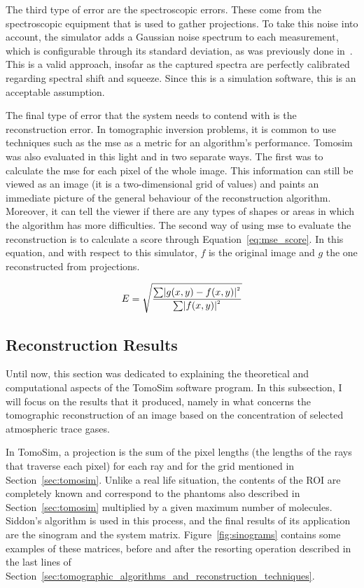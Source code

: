 The third type of error are the spectroscopic errors. These come from
the spectroscopic equipment that is used to gather projections. To take
this noise into account, the simulator adds a Gaussian noise spectrum to
each measurement, which is configurable through its standard deviation,
as was previously done in~\cite{Stutz1996}. This is a valid approach,
insofar as the captured spectra are perfectly calibrated regarding
spectral shift and squeeze. Since this is a simulation software, this is
an acceptable assumption.

The final type of error that the system needs to contend with is the
reconstruction error. In tomographic inversion problems, it is common to
use techniques such as the \gls{mse} as a metric for an algorithm's
performance. Tomosim was also evaluated in this light and in two
separate ways. The first was to calculate the \gls{mse} for each pixel of the
whole image. This information can still be viewed as an image (it is a
two-dimensional grid of values) and paints an immediate picture of the
general behaviour of the reconstruction algorithm. Moreover, it can tell
the viewer if there are any types of shapes or areas in which the
algorithm has more difficulties. The second way of using \gls{mse} to
evaluate the reconstruction is to calculate a score through
Equation~\ref{eq:mse_score}. In this equation, and with respect to this
simulator, $f$ is the original image and $g$ the one reconstructed from
projections.

\begin{equation}
    \centering
    \label{eq:mse_score}
    E = \sqrt{\frac{\sum\lvert g(x,y) - f(x,y)
    \lvert^{^{2}}}{\sum\lvert f(x,y) \lvert ^{^{2}}}}
\end{equation}

\subsection{Reconstruction Results}%
\label{sub:reconstruction_results}

Until now, this section was dedicated to explaining the theoretical and
computational aspects of the TomoSim software program.  In this
subsection, I will focus on the results that it produced, namely in what
concerns the tomographic reconstruction of an image based on the
concentration of selected atmospheric trace gases.

In TomoSim, a projection is the sum of the pixel lengths (the lengths of
the rays that traverse each pixel) for each ray and for the grid
mentioned in Section~\ref{sec:tomosim}. Unlike a real life situation,
the contents of the ROI are completely known and correspond to the
phantoms also described in Section~\ref{sec:tomosim} multiplied by a
given maximum number of molecules. Siddon's algorithm is used in this
process, and the final results of its application are the sinogram and
the system matrix. Figure~\ref{fig:sinograms} contains some examples of
these matrices, before and after the resorting operation described in
the last lines of
Section~\ref{sec:tomographic_algorithms_and_reconstruction_techniques}.

